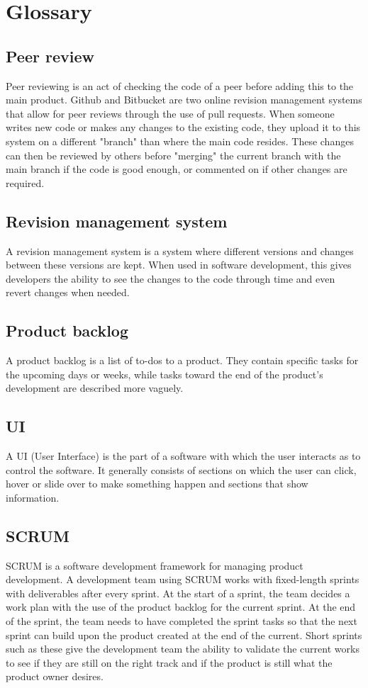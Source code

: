 \documentclass{article}
\begin{document}
\section{Glossary}

\subsection{Peer review}
Peer reviewing is an act of checking the code of a peer before adding this to the main product. Github and Bitbucket are two online revision management systems that allow for peer reviews through the use of pull requests. When someone writes new code or makes any changes to the existing code, they upload it to this system on a different "branch" than where the main code resides. These changes can then be reviewed by others before "merging" the current branch with the main branch if the code is good enough, or commented on if other changes are required.
\subsection{Revision management system}
A revision management system is a system where different versions and changes between these versions are kept. When used in software development, this gives developers the ability to see the changes to the code through time and even revert changes when needed.
\subsection{Product backlog}
A product backlog is a list of to-dos to a product. They contain specific tasks for the upcoming days or weeks, while tasks toward the end of the product's development are described more vaguely.
\subsection{UI}
A UI (User Interface) is the part of a software with which the user interacts as to control the software. It generally consists of sections on which the user can click, hover or slide over to make something happen and sections that show information.
\subsection{SCRUM}
SCRUM is a software development framework for managing product development. A development team using SCRUM works with fixed-length sprints with deliverables after every sprint. At the start of a sprint, the team decides a work plan with the use of the product backlog for the current sprint. At the end of the sprint, the team needs to have completed the sprint tasks so that the next sprint can build upon the product created at the end of the current. Short sprints such as these give the development team the ability to validate the current works to see if they are still on the right track and if the product is still what the product owner desires.


\end{document}
